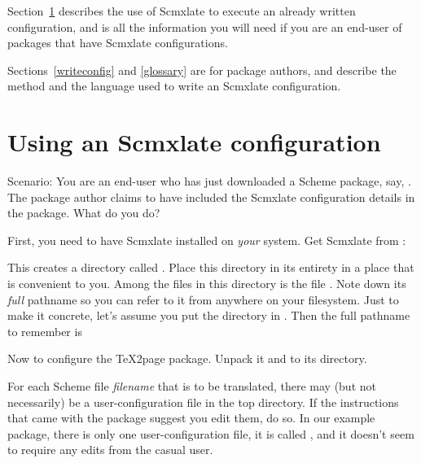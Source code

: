 Section~\ref{useconfig} describes the use of Scmxlate
to execute an already written configuration, and is all
the information you will need if you are an
end-user of packages that have Scmxlate configurations.

Sections~\ref{writeconfig} and \ref{glossary} are for
package authors, and describe the method and the
language used to write an Scmxlate configuration.

\bigbreak


\tableofcontents

\ifx\shipout\totheWeb\else
\vfill\eject
\fi

\section{Using an Scmxlate configuration}
\label{useconfig}

Scenario: You are an end-user who has just downloaded a
Scheme package, say,
.
The package author claims to have included the Scmxlate
configuration details in the package.  What do
you do?

First, you need to have Scmxlate installed on {\em
your} system.  Get Scmxlate from
:


\n This creates a directory called .  Place
this directory in its entirety in a place that is
convenient to you.  Among the files in this directory
is the file .  Note down
its {\em full} pathname so you can refer to it from
anywhere on your filesystem.
Just to make it concrete, let's assume you put the
 directory in .  Then the
full pathname to remember is


Now to configure the TeX2page package.  Unpack it
and  to its directory.

For each Scheme file {\em filename}  that is to be
translated, there may (but not necessarily) be a
user-configuration file  in
the top directory.  If the instructions that came with
the package suggest you edit them, do so.  In our
example package, there is only one user-configuration
file, it is called , and it
doesn't seem to require any edits from the casual user.


